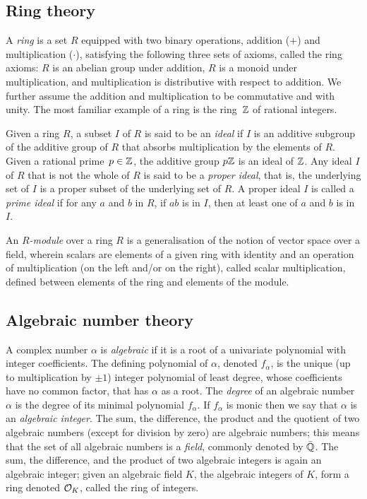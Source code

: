 \subsection{Ring theory}

A \emph{ring} is a set $R$ equipped with two binary operations, addition ($+$) and multiplication ($\cdot$), satisfying the following three sets of axioms, called the ring axioms: $R$ is an abelian group under addition, $R$ is a monoid under multiplication, and multiplication is distributive with respect to addition. We further assume the addition and multiplication to be commutative and with unity. The most familiar example of a ring is the ring~$\mathbb{Z}$ of rational integers. 

Given a ring $R$, a subset $I$ of $R$ is said to be an \emph{ideal} if $I$ is an additive subgroup of the additive group of $R$ that absorbs multiplication by the elements of $R$. 
Given a rational prime~$p\in \mathbb{Z}$, the additive group $p\mathbb{Z}$ is an ideal of $\mathbb{Z}$.
Any ideal $I$ of $R$ that is not the whole of $R$ is said to be a \emph{proper ideal}, that is, the underlying set of $I$ is a proper subset of the underlying set of $R$. A proper ideal $I$ is called a \emph{prime ideal} if for any $a$ and $b$ in $R$, if $ab$ is in $I$, then at least one of $a$ and $b$ is in $I$.

An \emph{$R$-module} over a ring $R$ is a generalisation of the notion of vector space over a field, wherein scalars are elements of a given ring with identity and an operation of multiplication (on the left and/or on the right), called scalar multiplication,  defined between elements of the ring and elements of the module.

\subsection{Algebraic number theory}
A complex number $\alpha$ is \emph{algebraic} if it is a root of a univariate polynomial with integer coefficients. The defining polynomial of $\alpha$, denoted $f_\alpha$, is the unique (up to multiplication by $\pm 1$) integer polynomial of least degree, whose coefficients have no common factor, that has $\alpha$ as a root.
The \emph{degree} of an algebraic number $\alpha$ is the degree of its minimal polynomial $f_\alpha$.
If $f_\alpha$ is monic then we say that $\alpha$ is an \emph{algebraic integer}.
The sum, the difference, the product and the quotient of two algebraic numbers (except for division by zero) are algebraic numbers; this means that the set of all algebraic numbers is a \emph{field}, commonly denoted by $\Bar{\mathbb{Q}}$. The sum, the difference, and the product of two algebraic integers is again an algebraic integer; given an algebraic field $K$, the algebraic integers of $K$, form a ring denoted $\mathcal{O}_K$, called the ring of integers.

